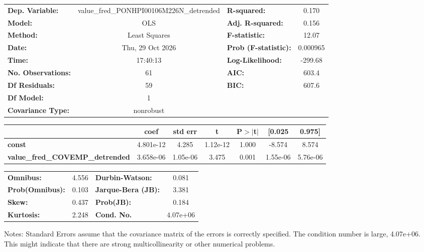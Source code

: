 \begin{center}
\begin{tabular}{lclc}
\toprule
\textbf{Dep. Variable:}                 & value\_fred\_PONHPI00106M226N\_detrended & \textbf{  R-squared:         } &     0.170   \\
\textbf{Model:}                         &                   OLS                    & \textbf{  Adj. R-squared:    } &     0.156   \\
\textbf{Method:}                        &              Least Squares               & \textbf{  F-statistic:       } &     12.07   \\
\textbf{Date:}                          &             Thu, 29 Oct 2026             & \textbf{  Prob (F-statistic):} &  0.000965   \\
\textbf{Time:}                          &                 17:40:13                 & \textbf{  Log-Likelihood:    } &   -299.68   \\
\textbf{No. Observations:}              &                      61                  & \textbf{  AIC:               } &     603.4   \\
\textbf{Df Residuals:}                  &                      59                  & \textbf{  BIC:               } &     607.6   \\
\textbf{Df Model:}                      &                       1                  & \textbf{                     } &             \\
\textbf{Covariance Type:}               &                nonrobust                 & \textbf{                     } &             \\
\bottomrule
\end{tabular}
\begin{tabular}{lcccccc}
                                        & \textbf{coef} & \textbf{std err} & \textbf{t} & \textbf{P$> |$t$|$} & \textbf{[0.025} & \textbf{0.975]}  \\
\midrule
\textbf{const}                          &    4.801e-12  &        4.285     &  1.12e-12  &         1.000        &       -8.574    &        8.574     \\
\textbf{value\_fred\_COVEMP\_detrended} &    3.658e-06  &     1.05e-06     &     3.475  &         0.001        &     1.55e-06    &     5.76e-06     \\
\bottomrule
\end{tabular}
\begin{tabular}{lclc}
\textbf{Omnibus:}       &  4.556 & \textbf{  Durbin-Watson:     } &    0.081  \\
\textbf{Prob(Omnibus):} &  0.103 & \textbf{  Jarque-Bera (JB):  } &    3.381  \\
\textbf{Skew:}          &  0.437 & \textbf{  Prob(JB):          } &    0.184  \\
\textbf{Kurtosis:}      &  2.248 & \textbf{  Cond. No.          } & 4.07e+06  \\
\bottomrule
\end{tabular}
\end{center}

Notes: \newline
 [1] Standard Errors assume that the covariance matrix of the errors is correctly specified. \newline
 [2] The condition number is large, 4.07e+06. This might indicate that there are \newline
 strong multicollinearity or other numerical problems.